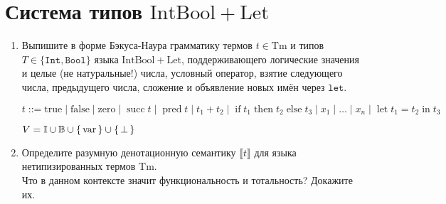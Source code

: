 \documentclass{article}
\DeclareMathOperator{\tsucc}{succ}
\DeclareMathOperator{\tpred}{pred}
\DeclareMathOperator{\tlet}{let}
\DeclareMathOperator{\tin}{in}
\DeclareMathOperator{\tthen}{then}
\DeclareMathOperator{\telse}{else}
\DeclareMathOperator{\tif}{if}
\DeclareMathOperator{\colqq}{::=}
\begin{document}
\section*{\centering Система типов $\mathrm{IntBool}+\mathrm{Let}$}

\begin{enumerate}
    \item Выпишите в форме Бэкуса-Наура грамматику термов $t \in \mathrm{Tm}$ и типов $T \in \{\mathtt{Int}, \mathtt{Bool}\}$ языка $\mathrm{IntBool}+\mathrm{Let}$, поддерживающего логические значения и целые (не натуральные!) числа, условный оператор, взятие следующего числа, предыдущего числа, сложение и объявление новых имён через $\mathtt{let}$.
    
        $t \colqq \mathrm{true} \mid \mathrm{false} \mid \mathrm{zero} \mid \tsucc t \mid \tpred t \mid t_1 + t_2 \mid \tif t_1 \tthen  t_2 \telse t_3\mid x_1\mid\dots\mid x_n\mid \tlet t_1 = t_2\tin  t_3$
        
        $V =  \mathbb{I} \cup \mathbb{B} \cup \set{\mathrm{var}} \cup \set{\bot} $

    \item Определите разумную денотационную семантику $\llbracket t\rrbracket$ для языка нетипизированных термов $\mathrm{Tm}$.\\
    Что в данном контексте значит функциональность и тотальность? Докажите их.


\end{enumerate}
\end{document}
